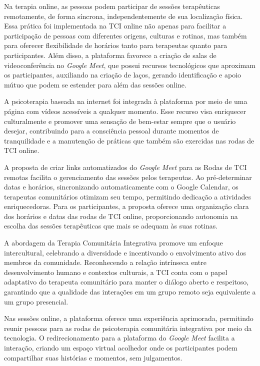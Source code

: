         Na terapia online, as pessoas podem participar de sessões terapêuticas remotamente, de forma síncrona, independentemente de sua localização física. Essa prática foi implementada na TCI online não apenas para facilitar a participação de pessoas com diferentes origens, culturas e rotinas, mas também para oferecer flexibilidade de horários tanto para terapeutas quanto para participantes. Além disso, a plataforma favorece a criação de salas de videoconferência no \textit{Google Meet}, que possui recursos tecnológicos que aproximam os participantes, auxiliando na criação de laços, gerando identificação e apoio mútuo que podem se estender para além das sessões online.
        
        A psicoterapia baseada na internet foi integrada à plataforma por meio de uma página com vídeos acessíveis a qualquer momento. Esse recurso visa enriquecer culturalmente e promover uma sensação de bem-estar sempre que o usuário desejar, contribuindo para a consciência pessoal durante momentos de tranquilidade e a manutenção de práticas que também são exercidas nas rodas de TCI online.
        
        A proposta de criar links automatizados do \textit{Google Meet} para as Rodas de TCI remotas facilita o gerenciamento das sessões pelos terapeutas. Ao pré-determinar datas e horários, sincronizando automaticamente com o Google Calendar, os terapeutas comunitários otimizam seu tempo, permitindo dedicação a atividades enriquecedoras. Para os participantes, a proposta oferece uma organização clara dos horários e datas das rodas de TCI online, proporcionando autonomia na escolha das sessões terapêuticas que mais se adequam às suas rotinas.
        
        A abordagem da Terapia Comunitária Integrativa promove um enfoque intercultural, celebrando a diversidade e incentivando o envolvimento ativo dos membros da comunidade. Reconhecendo a relação intrínseca entre desenvolvimento humano e contextos culturais, a TCI conta com o papel adaptativo do terapeuta comunitário para manter o diálogo aberto e respeitoso, garantindo que a qualidade das interações em um grupo remoto seja equivalente a um grupo presencial.
        
        Nas sessões online, a plataforma oferece uma experiência aprimorada, permitindo reunir pessoas para as rodas de psicoterapia comunitária integrativa por meio da tecnologia. O redirecionamento para a plataforma do \textit{Google Meet} facilita a interação, criando um espaço virtual acolhedor onde os participantes podem compartilhar suas histórias e momentos, sem julgamentos.
        

